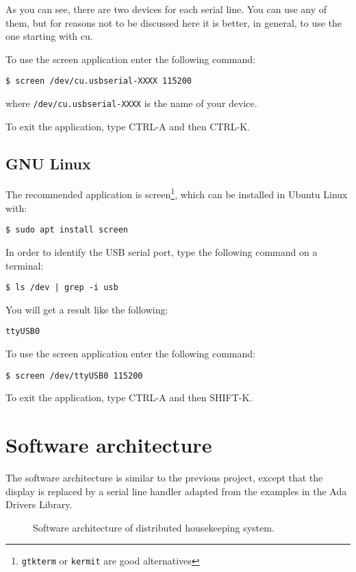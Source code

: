 As you can see, there are two devices for each serial line. You can use any of them, but for reasons not to be discussed here it is better, in general, to use the one starting with cu.

To use the screen application enter the following command:
\begin{verbatim}
$ screen /dev/cu.usbserial-XXXX 115200
\end{verbatim}

where {\tt /dev/cu.usbserial-XXXX} is the name of your device.

To exit the application, type CTRL-A and then CTRL-K.

\subsection{GNU Linux}

The recommended application is screen\footnote{{\tt gtkterm} or {\tt kermit} are good alternatives}, which can be installed in Ubuntu Linux with:
\begin{verbatim}
$ sudo apt install screen
\end{verbatim}

In order to identify the USB serial port, type the following command on a terminal:

\begin{verbatim}
$ ls /dev | grep -i usb
\end{verbatim}

You will get a result like the following:
\begin{verbatim}
ttyUSB0
\end{verbatim}

To use the screen application enter the following command:

\begin{verbatim}
$ screen /dev/ttyUSB0 115200
\end{verbatim}

To exit the application, type CTRL-A and then SHIFT-K.

\section{Software architecture}

The software architecture is similar to the previous project, except that the display is replaced by a serial line handler adapted from the examples in the Ada Drivers Library.


\begin{figure}[h]
            \caption{Software architecture of distributed housekeeping system.}
            \label{fig:distributed}
\end{figure}

